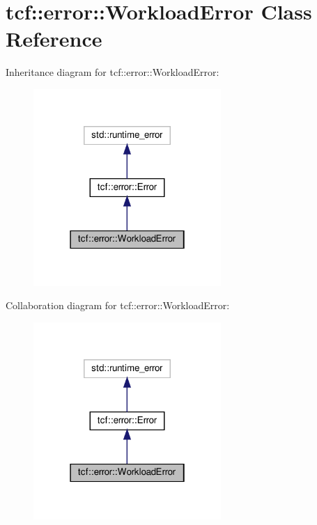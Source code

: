 \hypertarget{classtcf_1_1error_1_1WorkloadError}{}\section{tcf\+:\+:error\+:\+:Workload\+Error Class Reference}
\label{classtcf_1_1error_1_1WorkloadError}


Inheritance diagram for tcf\+:\+:error\+:\+:Workload\+Error\+:
\nopagebreak
\begin{figure}[H]
\begin{center}
\leavevmode
\includegraphics[width=202pt]{classtcf_1_1error_1_1WorkloadError__inherit__graph}
\end{center}
\end{figure}


Collaboration diagram for tcf\+:\+:error\+:\+:Workload\+Error\+:
\nopagebreak
\begin{figure}[H]
\begin{center}
\leavevmode
\includegraphics[width=202pt]{classtcf_1_1error_1_1WorkloadError__coll__graph}
\end{center}
\end{figure}

